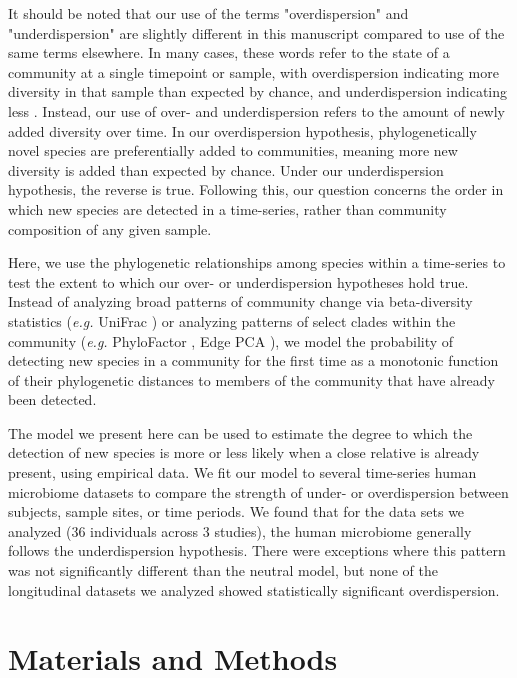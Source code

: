 \documentclass{article}
\begin{document}
It should be noted that our use of the terms "overdispersion" and "underdispersion" are slightly different in this manuscript compared to use of the same terms elsewhere. In many cases, these words refer to the state of a community at a single timepoint or sample, with overdispersion indicating more diversity in that sample than expected by chance, and underdispersion indicating less \cite{Webb2002}. Instead, our use of over- and underdispersion refers to the amount of newly added diversity over time. In our overdispersion hypothesis, phylogenetically novel species are preferentially added to communities, meaning more new diversity is added than expected by chance. Under our underdispersion hypothesis, the reverse is true. Following this, our question concerns the order in which new species are detected in a time-series, rather than community composition of any given sample.
\par
Here, we use the phylogenetic relationships among species within a time-series to test the extent to which our over- or underdispersion hypotheses hold true. Instead of analyzing broad patterns of community change via beta-diversity statistics (\emph{e.g.} UniFrac \cite{Lozupone2005}) or analyzing patterns of select clades within the community (\emph{e.g.} PhyloFactor \cite{Washburne2017}, Edge PCA \cite{Matsen2013}), we model the probability of detecting new species in a community for the first time as a monotonic function of their phylogenetic distances to members of the community that have already been detected. 
\par
The model we present here can be used to estimate the degree to which the detection of new species is more or less likely when a close relative is already present, using empirical data. We fit our model to several time-series human microbiome datasets \cite{Caporaso2011,Koenig2011,Yassour2016} to compare the strength of under- or overdispersion between subjects, sample sites, or time periods. We found that for the data sets we analyzed (36 individuals across 3 studies), the human microbiome generally follows the underdispersion hypothesis. There were exceptions where this pattern was not significantly different than the neutral model, but none of the longitudinal datasets we analyzed showed statistically significant overdispersion. 
\\\par



\section{Materials and Methods}
\end{document}

